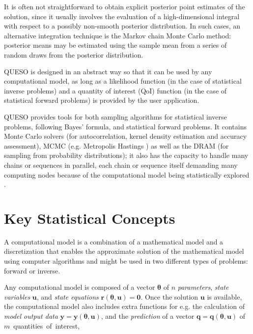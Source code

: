 It is often not straightforward to obtain explicit posterior point estimates of the solution, since it usually involves the evaluation of a high-dimensional integral with respect to a possibly non-smooth posterior distribution. In such cases, an alternative integration technique is the Markov chain Monte Carlo method: posterior means may be estimated using the sample mean from a series of random draws from the posterior distribution.

QUESO is designed in an abstract way so that it can be used by any computational model, as long as a likelihood function (in the case of statistical inverse problems) and a quantity of interest (QoI) function (in the case of statistical forward problems) is provided by the user application.

QUESO provides tools for both sampling algorithms for statistical inverse problems, following Bayes' formula, and statistical forward problems. It contains Monte Carlo solvers (for autocorrelation, kernel density estimation and accuracy assessment), MCMC (e.g. Metropolis Hastings \cite{Metr_1953,Hast_1970}) as well as the DRAM \cite{HaLaMiSa06} (for sampling from probability distributions); it also has the capacity to handle many chains or sequences in parallel, each chain or sequence itself demanding many computing nodes because of the computational model being statistically explored \cite{PrSc12}.

\section{Key Statistical Concepts}\label{sec:statistical_concepts}

A computational model is a combination of a
mathematical model and a discretization that enables the approximate
solution of the mathematical model using computer algorithms and  might be used in two different types of problems:
forward or inverse. 

Any computational model is composed of a vector $\boldsymbol{\theta}$ of $n$ {\it parameters}, {\it state variables} $\mathbf{u}$, and {\it state equations} $\mathbf{r}(\boldsymbol{\theta},\mathbf{u}) = \mathbf{0}$.
Once the solution $\mathbf{u}$ is available, the computational model also includes extra functions for e.g.
the calculation of {\it model output data} $\mathbf{y} = \mathbf{y}(\boldsymbol{\theta},\mathbf{u})$, and the {\it prediction} of a
vector $\mathbf{q} = \mathbf{q}(\boldsymbol{\theta},\mathbf{u})$ of $m$~quantities~of~interest,

